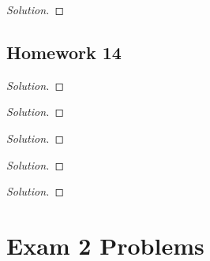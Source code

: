 \begin{problem}[WebAssign, HW 13, \# 6]
\end{problem}
\begin{proof}[Solution]
\end{proof}


\subsection{Homework 14}
\begin{problem}[WebAssign, HW 14, \# 1]
\end{problem}
\begin{proof}[Solution]
\end{proof}

\begin{problem}[WebAssign, HW 14, \# 2]
\end{problem}
\begin{proof}[Solution]
\end{proof}

\begin{problem}[WebAssign, HW 14, \# 3]
\end{problem}
\begin{proof}[Solution]
\end{proof}

\begin{problem}[WebAssign, HW 14, \# 4]
\end{problem}
\begin{proof}[Solution]
\end{proof}

\begin{problem}[WebAssign, HW 14, \# 5]
\end{problem}
\begin{proof}[Solution]
\end{proof}

\section{Exam 2 Problems}


